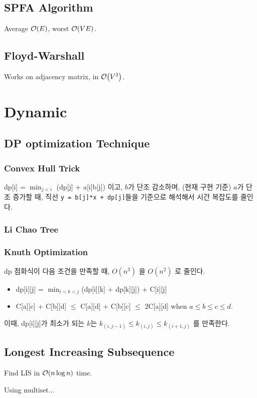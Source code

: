 \documentclass[landscape,8pt]{article}
\begin{document}
\begin{multicols}{2}
  \subsection{SPFA Algorithm}
    Average $\order{E}$, worst $\order{VE}$.
    

  \subsection{Floyd-Warshall}
    Works on adjacency matrix, in $\order{V^3}$.
      


\section{Dynamic}
  \subsection{DP optimization Technique}
  \subsubsection{Convex Hull Trick}
    dp[i] = $\min_{j < i}$ (dp[j] + a[i]b[j]) 이고, $b$가 단조 감소하며, (현재 구현 기준) $a$가 단조 증가할 때, 직선 \texttt{y = b[j]*x + dp[j]}들을 기준으로 해석해서 시간 복잡도를 줄인다.
    
  \subsubsection{Li Chao Tree}
    
  \subsubsection{Knuth Optimization}
    dp 점화식이 다음 조건을 만족할 때, $O(n^3)$ 을 $O(n^2)$ 로 줄인다.
    \begin{itemize}
      \item dp[i][j] = $\min_{i < k < j}$(dp[i][k] + dp[k][j]) + C[i][j]
      \item C[a][c] + C[b][d] $\leq$ C[a][d] + C[b][c] $\leq$ 2C[a][d] when $a \leq b \leq c \leq d$.
    \end{itemize}
    이때, dp[i][j]가 최소가 되는 $k$는 $k_{(i, j-1)} \leq k_{(i, j)} \leq k_{(i+1, j)}$ 를 만족한다.
      
  \subsection{Longest Increasing Subsequence}
    Find LIS in $\order{n \log n}$ time.
      
    Using multiset...
      

\end{multicols}
\end{document}

